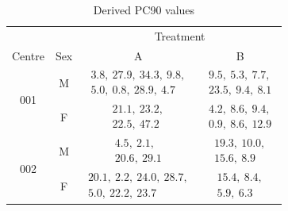 \begin{table}[h]
\centering
\caption{Derived PC90 values}\label{pc90}
\begin{tabular}{|cc|c|c|}
\hline
&&\multicolumn{2}{c|}{Treatment}\\
Centre&Sex&A&B\\\hline
\multirow{2}{*}{001}&M&$\begin{array}{c}3.8,\ 27.9,\ 34.3,\  9.8,\\5.0,\  0.8,\ 28.9,\  4.7\end{array}$&$\begin{array}{c}9.5,\  5.3,\  7.7,\\23.5,\  9.4,\  8.1\end{array}$\\\cline{2-4}
&F&$\begin{array}{c}21.1,\ 23.2,\\22.5,\ 47.2\end{array}$&$\begin{array}{c}4.2,\ 8.6 ,\ 9.4,\\0.9,\ 8.6,\ 12.9\end{array}$\\\hline
\multirow{2}{*}{002}&M&$\begin{array}{c}4.5,\ 2.1,\\20.6,\ 29.1\end{array}$&$\begin{array}{c}19.3,\ 10.0,\\15.6,\ 8.9\end{array}$\\\cline{2-4}
&F&$\begin{array}{c}20.1,\ 2.2,\ 24.0,\ 28.7,\\5.0,\ 22.2,\ 23.7\end{array}$&$\begin{array}{c}15.4,\  8.4,\\5.9,\ 6.3\end{array}$\\\hline
\end{tabular}
\end{table}
